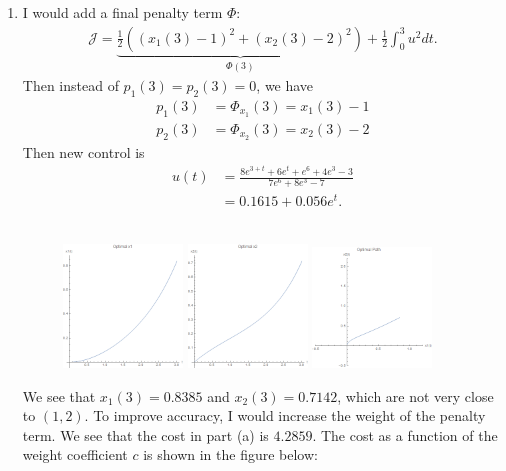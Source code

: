\documentclass[12pt]{article}
\begin{document}
\begin{problem}[1]
\begin{enumerate}[label=(\alph*)]
\item I would add a final penalty term $ \Phi$:
\begin{align*}
	\mathcal{ J} = \underbrace{ \frac{1}{2} \left( (x_1(3)-1)^2+(x_2(3)-2)^2 \right)  }_{\Phi(3) } + \frac{1}{2} \int_0^3 u^2 dt .
\end{align*}
Then instead of $ p_1(3)=p_2(3)=0$, we have
\begin{align*}
	p_1(3) &= \Phi_{x_1}(3) = x_1(3)-1 \\
	p_2(3) &= \Phi_{x_2}(3) = x_2(3)-2 
\end{align*}
Then new control is
\begin{align*}
	u(t) &= \frac{8e^{3+t}+6e^{t}+e^{6}+4e^3-3}{7e^{6}+8e^3-7}\\
	&= 0.1615+0.056 e^{t} .
\end{align*}
~\begin{figure}[H]
	\centering
	\includegraphics[width=0.3\textwidth]{./figures/4.7.png}
	\includegraphics[width=0.3\textwidth]{./figures/4.8.png}
	\includegraphics[width=0.3\textwidth]{./figures/4.9.png}
\end{figure}
We see that $ x_1(3) = 0.8385$ and $ x_2(3) = 0.7142$, which are not very close to $ (1,2)$. To improve accuracy, I would increase the weight of the penalty term. We see that the cost in part (a) is  $ 4.2859$. The cost as a function of the weight coefficient  $ c$ is shown in the figure below:

\end{enumerate}
\end{problem}
\end{document}

